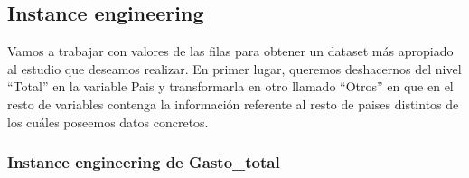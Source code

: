 \documentclass[data,article,submit,moreauthors,pdftex]{Definitions/mdpi}
\newenvironment{Shaded}{\begin{snugshade}}{\end{snugshade}}
\newcommand{\CommentTok}[1]{\textcolor[rgb]{0.56,0.35,0.01}{\textit{#1}}}
\newcommand{\FunctionTok}[1]{\textcolor[rgb]{0.13,0.29,0.53}{\textbf{#1}}}
\newcommand{\NormalTok}[1]{#1}
\newcommand{\OtherTok}[1]{\textcolor[rgb]{0.56,0.35,0.01}{#1}}
\newcommand{\SpecialCharTok}[1]{\textcolor[rgb]{0.81,0.36,0.00}{\textbf{#1}}}
\newcommand{\StringTok}[1]{\textcolor[rgb]{0.31,0.60,0.02}{#1}}
\begin{document}
\begin{Shaded}
\end{Shaded}

\hypertarget{instance-engineering}{%
\subsection{Instance engineering}\label{instance-engineering}}

Vamos a trabajar con valores de las filas para obtener un dataset más
apropiado al estudio que deseamos realizar. En primer lugar, queremos
deshacernos del nivel ``Total'' en la variable Pais y transformarla en
otro llamado ``Otros'' en que en el resto de variables contenga la
información referente al resto de paises distintos de los cuáles
poseemos datos concretos.

\begin{Shaded}
\end{Shaded}

\hypertarget{instance-engineering-de-gasto_total}{%
\subsubsection{Instance engineering de
Gasto\_total}\label{instance-engineering-de-gasto_total}}
\end{document}

